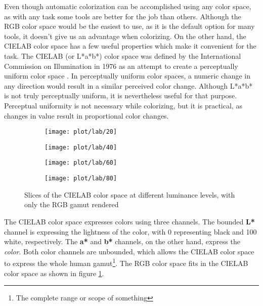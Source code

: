 Even though automatic colorization can be accomplished using any color space, 
as with any task some tools are better for the job than others. Although the 
RGB color space would be the easiest to use, as it is the default option for 
many tools, it doesn't give us an advantage when colorizing. On the other hand, 
the CIELAB color space has a few useful properties which make it convenient 
for the task. The CIELAB (or L*a*b*) color space was defined by the 
International Commission on Illumination in 1976 as an attempt to create a 
perceptually uniform color space \citep{icc2004cielab}. 
In perceptually uniform color spaces, a numeric change in any direction 
would result in a similar perceived color change. Although L*a*b* is not truly 
perceptually uniform, it is nevertheless useful for that purpose. Perceptual 
uniformity is not necessary while colorizing, but it is practical, as changes 
in value result in proportional color changes.

\begin{figure}[!h]
	\centering
	\begin{subfigure}{.24\textwidth}
		\centering
		\texttt{[image: plot/lab/20]}
	\end{subfigure}
	\begin{subfigure}{.24\textwidth}
		\centering
		\texttt{[image: plot/lab/40]}
	\end{subfigure}
	\begin{subfigure}{.24\textwidth}
		\centering
		\texttt{[image: plot/lab/60]}
	\end{subfigure}
	\begin{subfigure}{.24\textwidth}
		\centering
		\texttt{[image: plot/lab/80]}
	\end{subfigure}
    \caption{Slices of the CIELAB color space at different luminance levels, with only the RGB gamut rendered}
	\label{fig:rgb_in_lab}
\end{figure}

The CIELAB color space expresses colors using three channels. The bounded \textbf{L*}
channel is expressing the lightness of the color, with 0 representing black and 100 
white, respectively. The \textbf{a*} and \textbf{b*} channels, on the other hand, 
express the \textit{color}. Both color channels are unbounded, which allows the 
CIELAB color space to express the whole human gamut\footnote{The complete range 
or scope of something}. The RGB color space fits in the CIELAB color space 
as shown in figure \ref{fig:rgb_in_lab}.

